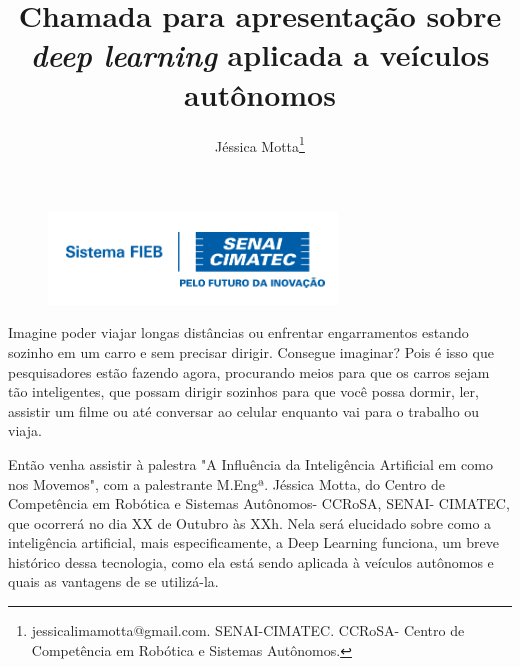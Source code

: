 \documentclass[12pt,a4paper]{article}
\begin{document}
 
\begin{figure}
    \flushright
    \includegraphics[scale=0.5]{Logo_senai.png}
\end{figure}

\title{Chamada para apresentação sobre \emph{deep learning} aplicada a veículos autônomos}
\author{Jéssica Motta\thanks{jessicalimamotta@gmail.com. SENAI-CIMATEC. CCRoSA- Centro de Competência em Robótica e Sistemas Autônomos.}}
 

    \maketitle
    \singlespacing


Imagine poder viajar longas distâncias ou enfrentar engarramentos estando sozinho em um carro e sem precisar dirigir. Consegue imaginar? Pois é isso que pesquisadores estão fazendo agora, procurando meios para que os carros sejam tão inteligentes, que possam dirigir sozinhos para que você possa dormir, ler, assistir um filme ou até conversar ao celular enquanto vai para o trabalho ou viaja.

Então venha assistir à palestra "A Influência da Inteligência Artificial em como nos Movemos", com a palestrante M.Engª. Jéssica Motta, do Centro de Competência em Robótica e Sistemas Autônomos- CCRoSA, SENAI- CIMATEC, que ocorrerá no dia XX de Outubro às XXh. Nela será elucidado sobre como a inteligência artificial, mais especificamente, a Deep Learning funciona, um breve histórico dessa tecnologia, como ela está sendo aplicada à veículos autônomos e quais as vantagens de se utilizá-la.
\end{document}
